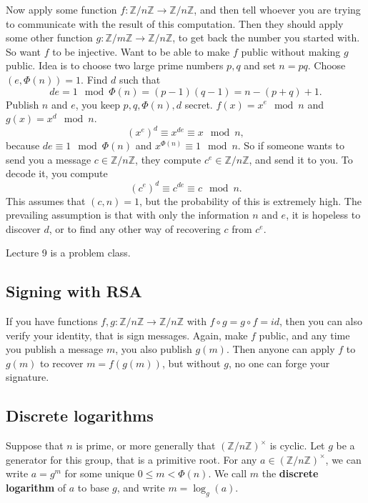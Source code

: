 \documentclass{article}
\newcommand{\Z}{\mathbb{Z}}
\newcommand{\rb}[1]{\left( #1 \right)}
\newcommand{\unit}[1]{\rb{\Z / #1\Z}^\times}
\theoremstyle{definition}\newtheorem{definition}{Definition}
\theoremstyle{definition}\newtheorem{remark}[definition]{Remark}
\theoremstyle{definition}\newtheorem*{example}{Example}
\theoremstyle{definition}\newtheorem*{note}{Note}
\begin{document}
Now apply some function $ f : \Z / n\Z \to \Z / n\Z $, and then tell whoever you are trying to communicate with the result of this computation. Then they should apply some other function $ g : \Z / m\Z \to \Z / n\Z $, to get back the number you started with. So want $ f $ to be injective. Want to be able to make $ f $ public without making $ g $ public. Idea is to choose two large prime numbers $ p, q $ and set $ n = pq $. Choose $ \rb{e, \Phi\rb{n}} = 1 $. Find $ d $ such that
$$ de = 1 \mod \Phi\rb{n} = \rb{p - 1}\rb{q - 1} = n - \rb{p + q} + 1. $$
Publish $ n $ and $ e $, you keep $ p, q, \Phi\rb{n}, d $ secret. $ f\rb{x} = x^e \mod n $ and $ g\rb{x} = x^d \mod n $.
$$ \rb{x^e}^d \equiv x^{de} \equiv x \mod n, $$
because $ de \equiv 1 \mod \Phi\rb{n} $ and $ x^{\Phi\rb{n}} \equiv 1 \mod n $. So if someone wants to send you a message $ c \in \Z / n\Z $, they compute $ c^e \in \Z / n\Z $, and send it to you. To decode it, you compute
$$ \rb{c^e}^d \equiv c^{de} \equiv c \mod n. $$
This assumes that $ \rb{c, n} = 1 $, but the probability of this is extremely high. The prevailing assumption is that with only the information $ n $ and $ e $, it is hopeless to discover $ d $, or to find any other way of recovering $ c $ from $ c^e $.


Lecture 9 is a problem class.

\subsection{Signing with RSA}

If you have functions $ f, g : \Z / n\Z \to \Z / n\Z $ with $ f \circ g = g \circ f = id $, then you can also verify your identity, that is sign messages. Again, make $ f $ public, and any time you publish a message $ m $, you also publish $ g\rb{m} $. Then anyone can apply $ f $ to $ g\rb{m} $ to recover $ m = f\rb{g\rb{m}} $, but without $ g $, no one can forge your signature.


\subsection{Discrete logarithms}

Suppose that $ n $ is prime, or more generally that $ \unit{n} $ is cyclic. Let $ g $ be a generator for this group, that is a primitive root. For any $ a \in \unit{n} $, we can write $ a = g^m $ for some unique $ 0 \le m < \Phi\rb{n} $. We call $ m $ the \textbf{discrete logarithm} of $ a $ to base $ g $, and write $ m = \log_g\rb{a} $.
\end{document}
